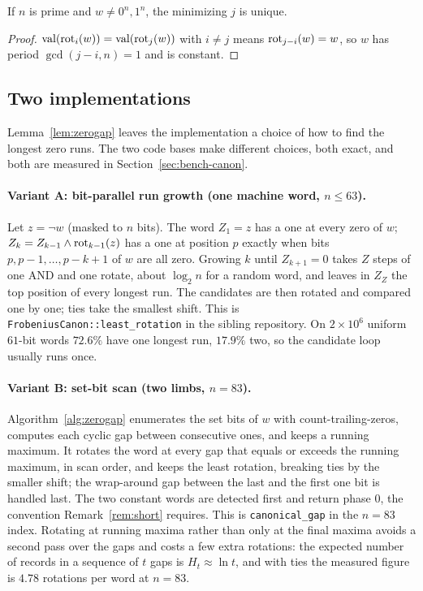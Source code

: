 \begin{corollary}
\label{cor:unique}
If $n$ is prime and $w\ne0^n,1^n$, the minimizing $j$ is unique.
\end{corollary}
\begin{proof}
$\operatorname{val}(\operatorname{rot}_i(w))=\operatorname{val}(\operatorname{rot}_j(w))$ with $i\ne j$ means
$\operatorname{rot}_{j-i}(w)=w$, so $w$ has period $\gcd(j-i,n)=1$ and is constant.
\end{proof}

\subsection{Two implementations}
\label{sec:canon-impl}

Lemma~\ref{lem:zerogap} leaves the implementation a choice of how to
find the longest zero runs. The two code bases make different choices,
both exact, and both are measured in Section~\ref{sec:bench-canon}.

\paragraph{Variant A: bit-parallel run growth (one machine word, $n\le63$).}
Let $z=\lnot w$ (masked to $n$ bits). The word
$Z_1=z$ has a one at every zero of $w$; $Z_k=Z_{k-1}\wedge\operatorname{rot}_{k-1}(z)$
has a one at position $p$ exactly when bits $p,p-1,\dots,p-k+1$ of
$w$ are all zero. Growing $k$ until $Z_{k+1}=0$ takes $Z$ steps of one
AND and one rotate, about $\log_2 n$ for a random word, and leaves in
$Z_Z$ the top position of every longest run. The candidates are then
rotated and compared one by one; ties take the smallest shift. This is
\texttt{FrobeniusCanon::least\_rotation} in the sibling
repository.
On $2\times10^6$ uniform $61$-bit words $72.6\%$ have one longest run,
$17.9\%$ two, so the candidate loop usually runs
once.

\paragraph{Variant B: set-bit scan (two limbs, $n=83$).}
Algorithm~\ref{alg:zerogap} enumerates the set bits of $w$ with
count-trailing-zeros, computes each cyclic gap between consecutive
ones, and keeps a running maximum. It rotates the word at every gap
that equals or exceeds the running maximum, in scan order, and keeps
the least rotation, breaking ties by the smaller shift; the wrap-around
gap between the last and the first one bit is handled last. The two
constant words are detected first and return phase $0$, the
convention Remark~\ref{rem:short} requires. This is
\texttt{canonical\_gap} in the $n=83$ index.
Rotating at running maxima rather than only at the final maxima
avoids a second pass over the gaps and costs a few extra rotations:
the expected number of records in a sequence of $t$ gaps is
$H_t\approx\ln t$, and with ties the measured figure is $4.78$
rotations per word at $n=83$.

